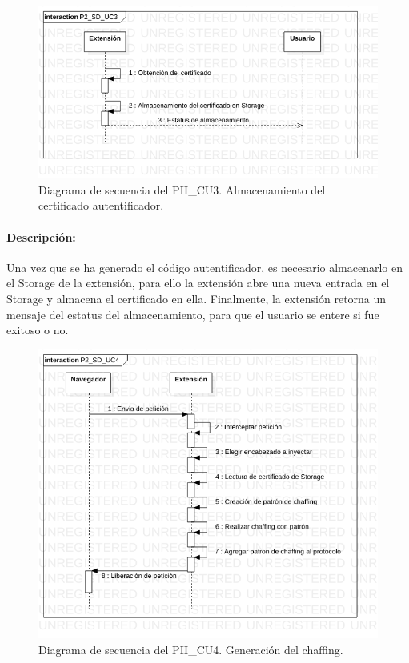 \documentclass[12pt, a4paper, titlepage]{report}
\begin{document}
    			\begin{figure}[H]
    				\begin{center}    		    	\includegraphics[width=15cm]{./imagenes/Desarrollo/Prototipo_2/P2_SD_UC3.png}
    				\caption[Diagrama de secuencia 3 del Prototipo II]{Diagrama de secuencia del PII\_CU3. Almacenamiento del certificado autentificador.}
    				\end{center}
    			\end{figure}
    			
    			\paragraph{Descripción:}
    			Una vez que se ha generado el código autentificador, es necesario almacenarlo en el Storage de la extensión, para ello la extensión abre una nueva entrada en el Storage y almacena el certificado en ella. Finalmente, la extensión retorna un mensaje del estatus del almacenamiento, para que el usuario se entere si fue exitoso o no.
    			
    			\begin{figure}[H]
    				\begin{center}    		    	\includegraphics[width=15cm]{./imagenes/Desarrollo/Prototipo_2/P2_SD_UC4.png}
    				\caption[Diagrama de secuencia 4 del Prototipo II]{Diagrama de secuencia del PII\_CU4. Generación del chaffing.}
    				\end{center}
    			\end{figure}
    			
\end{document}
